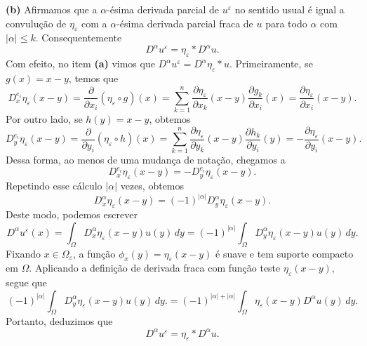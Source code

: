\documentclass[a4paper, 11pt]{book}
\theoremstyle{definition}
\begin{document}
\begin{prf}
    \textbf{(b)} Afirmamos que a $\alpha$-ésima derivada parcial de $u^\varepsilon$ no sentido usual é igual a convulução de $\eta_\varepsilon$ com a $\alpha$-ésima derivada parcial fraca de $u$ para todo $\alpha$ com $|\alpha| \leqslant k$. 
    Consequentemente
    \[
        D^\alpha u^\varepsilon = \eta_\varepsilon * D^\alpha u.
    \]
    Com efeito, no item \textbf{(a)} vimos que $D^\alpha u^\varepsilon = D^\alpha \eta_\varepsilon * u$. Primeiramente, se $g(x) = x - y$, temos que
    \[
        D^{e_i}_x \eta_\varepsilon (x -y) = \dfrac{\partial}{\partial x_i} (\eta_\varepsilon \circ g)(x) = \sum_{k=1}^n \dfrac{\partial \eta_\varepsilon}{\partial x_k} (x - y) \dfrac{\partial g_k}{\partial x_i}(x) = \dfrac{\partial \eta_\varepsilon}{\partial x_i}(x-y).
    \]
    Por outro lado, se $h(y) = x - y$, obtemos
    \[
        D^{e_i}_y \eta_\varepsilon (x-y) = \dfrac{\partial}{\partial y_i} (\eta_\varepsilon \circ h)(x) = \sum_{k=1}^n \dfrac{\partial \eta_\varepsilon}{\partial y_k} (x - y) \dfrac{\partial h_k}{\partial y_i}(y) = -\dfrac{\partial \eta_\varepsilon}{\partial y_i}(x-y).
    \]
    Dessa forma, ao menos de uma mudança de notação, chegamos a
    \[
        D^{e_i}_x \eta_\varepsilon (x-y) = -D^{e_i}_y \eta_\varepsilon (x-y).
    \]
    Repetindo esse cálculo $|\alpha|$ vezes, obtemos
    \[
        D^\alpha_x \eta_\varepsilon (x-y) = (-1)^{|\alpha|} D^\alpha_y \eta_\varepsilon (x-y).
    \]
    Deste modo, podemos escrever
    \[
        D^{\alpha} u^\varepsilon (x) = \int_\Omega D^\alpha_x \eta_\varepsilon (x-y) u(y) \,dy = (-1)^{|\alpha|} \int_\Omega D^{\alpha}_y \eta_\varepsilon (x-y) u(y) \,dy.
    \]
    Fixando $x \in \Omega_\varepsilon$, a função $\phi_x(y) =\eta_\varepsilon(x-y)$ é suave e tem suporte compacto em $\Omega$.
    Aplicando a definição de derivada fraca com função teste $\eta_\varepsilon(x-y)$, segue que
    \[
        (-1)^{|\alpha|} \int_\Omega D^{\alpha}_y \eta_\varepsilon (x-y) u(y) \,dy. = (-1)^{|\alpha| + |\alpha|}  \int_\Omega \eta_\varepsilon(x-y) D^{\alpha} u(y) \,dy.
    \]
    Portanto, deduzimos que
    \begin{equation}
        D^\alpha u^\varepsilon = \eta_\varepsilon * D^\alpha u.
    \end{equation}


\end{prf}
\end{document}
